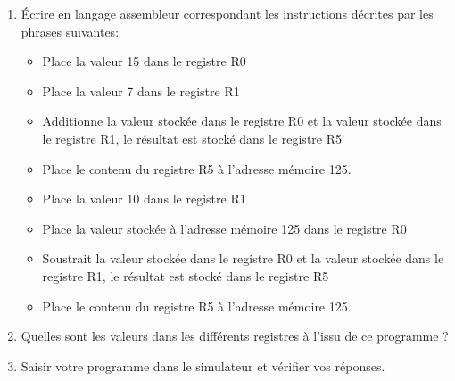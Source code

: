 \documentclass[12pt,a4paper]{article}
\begin{document}
\begin{enumerate}
\item Écrire en langage assembleur correspondant les instructions décrites par les phrases suivantes:
\begin{itemize}
\item Place la valeur 15 dans le registre R0 \vspace{1cm}
\item Place la valeur 7 dans le registre R1 \vspace{1cm}
\item Additionne la valeur stockée dans le registre R0 et la valeur stockée dans le registre R1, le résultat est stocké dans le registre R5 \vspace{1cm}
\item Place le contenu du registre R5 à l'adresse mémoire 125. \vspace{1cm}
\item Place la valeur 10 dans le registre R1 \vspace{1cm}
\item Place la valeur stockée à l'adresse mémoire 125 dans le registre R0 \vspace{1cm}
\item Soustrait la valeur stockée dans le registre R0 et la valeur stockée dans le registre R1, le résultat est stocké dans le registre R5 \vspace{1cm}
\item Place le contenu du registre R5 à l'adresse mémoire 125. \vspace{1cm}
\end{itemize}
\item Quelles sont les valeurs dans les différents registres à l'issu de ce programme ? \vspace{2cm}
\item Saisir votre programme dans le simulateur et vérifier vos réponses.
\end{enumerate}
\end{document}
